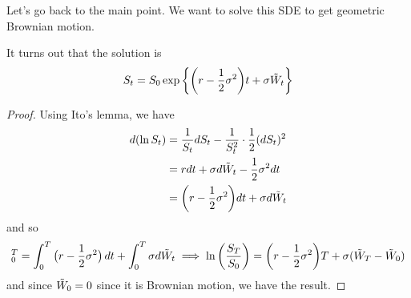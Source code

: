 \documentclass{article}
\begin{document}
    Let's go back to the main point. We want to solve this SDE to get geometric Brownian motion. 

    \begin{theorem}
      It turns out that the solution is 
      \begin{equation}
        S_t = S_0 \exp \bigg\{ \bigg( r - \frac{1}{2} \sigma^2 \bigg) t + \sigma \Tilde{W}_t \bigg\}
      \end{equation}
    \end{theorem}
    \begin{proof}
      Using Ito's lemma, we have 
      \begin{align}
        d (\ln S_t) & = \frac{1}{S_t} dS_t - \frac{1}{S_t^2} \cdot \frac{1}{2} (d S_t)^2 \\ 
                    & = r dt + \sigma d \Tilde{W}_t - \frac{1}{2} \sigma^2 dt \\
                    & = \bigg( r - \frac{1}{2} \sigma^2 \bigg) dt + \sigma d \Tilde{W}_t
      \end{align}
      and so 
      \begin{equation}
        [ \ln S_T ]_0^T = \int_0^T \big( r - \frac{1}{2} \sigma^2 \big) \,dt + \int_0^T \sigma d\Tilde{W}_t \implies \ln \bigg( \frac{S_T}{S_0} \bigg) = \bigg( r - \frac{1}{2} \sigma^2 \bigg) T + \sigma (\Tilde{W}_T - \Tilde{W}_0)
      \end{equation}
      and since $\Tilde{W}_0 = 0$ since it is Brownian motion, we have the result. 
    \end{proof}
\end{document}
